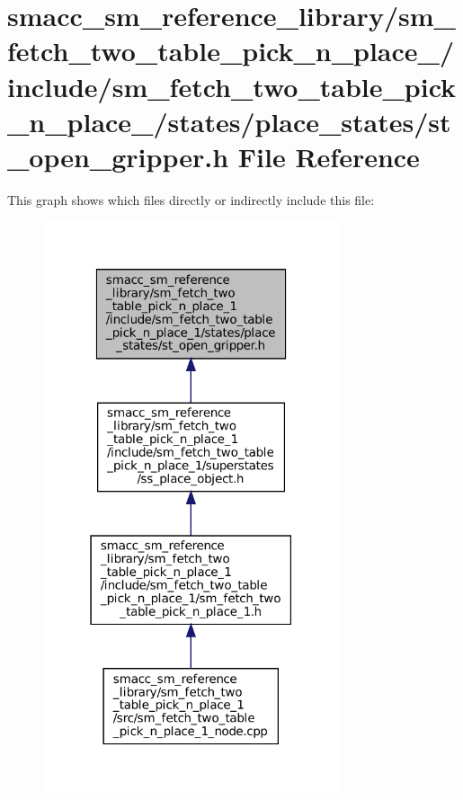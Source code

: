 \hypertarget{sm__fetch__two__table__pick__n__place__1_2include_2sm__fetch__two__table__pick__n__place__1_2sta988ce571eabef88c0fcb2433d13039e3}{}\section{smacc\+\_\+sm\+\_\+reference\+\_\+library/sm\+\_\+fetch\+\_\+two\+\_\+table\+\_\+pick\+\_\+n\+\_\+place\+\_/include/sm\+\_\+fetch\+\_\+two\+\_\+table\+\_\+pick\+\_\+n\+\_\+place\+\_/states/place\+\_\+states/st\+\_\+open\+\_\+gripper.h File Reference}
\label{sm__fetch__two__table__pick__n__place__1_2include_2sm__fetch__two__table__pick__n__place__1_2sta988ce571eabef88c0fcb2433d13039e3}
This graph shows which files directly or indirectly include this file\+:
\nopagebreak
\begin{figure}[H]
\begin{center}
\leavevmode
\includegraphics[width=247pt]{sm__fetch__two__table__pick__n__place__1_2include_2sm__fetch__two__table__pick__n__place__1_2sta424d556fc803ab77ba0abebf35fc0d99}
\end{center}
\end{figure}
